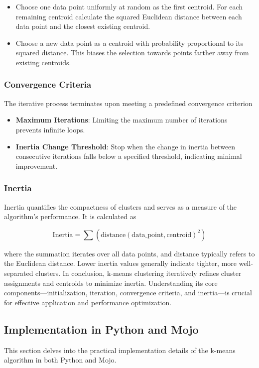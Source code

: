 \documentclass[conference]{IEEEtran}
\begin{document}
\begin{itemize}
    \item Choose one data point uniformly at random as the first centroid. For each remaining centroid calculate the squared Euclidean distance between each data point and the closest existing centroid.

    \item Choose a new data point as a centroid with probability proportional to its squared distance. This biases the selection towards points farther away from existing centroids.
\end{itemize}

\subsubsection{Convergence Criteria}
The iterative process terminates upon meeting a predefined convergence criterion

\begin{itemize}
    \item \textbf{Maximum Iterations}: Limiting the maximum number of iterations prevents infinite loops.

    \item \textbf{Inertia Change Threshold}: Stop when the change in inertia between consecutive iterations falls below a specified threshold, indicating minimal improvement.
\end{itemize}

\subsubsection{Inertia}
Inertia quantifies the compactness of clusters and serves as a measure of the algorithm's performance. It is calculated as

\[
\text{Inertia} = \sum \left( \text{distance}(\text{data\_point}, \text{centroid})^2 \right)
\]

where the summation iterates over all data points, and distance typically refers to the Euclidean distance. Lower inertia values generally indicate tighter, more well-separated clusters. In conclusion, k-means clustering iteratively refines cluster assignments and centroids to minimize inertia. Understanding its core components—initialization, iteration, convergence criteria, and inertia—is crucial for effective application and performance optimization.

\subsection{Implementation in Python and Mojo}
This section delves into the practical implementation details of the k-means algorithm in both Python and Mojo.
\end{document}
